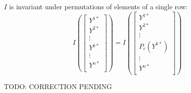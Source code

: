 \begin{appendices}
\begin{lemma}
\label{lemma:single row permutation}
$I$ is invariant under permutations of elements of a single row:
\begin{equation*}
    I \left(
    \begin{bmatrix}
        Y^{1\ast}\\
        Y^{2\ast}\\
        \vdots\\
        Y^{k\ast}\\
        \vdots\\
        Y^{n\ast}\\
    \end{bmatrix}   
    \right)
    =
    I \left(
    \begin{bmatrix}
        Y^{1\ast}\\
        Y^{2\ast}\\
        \vdots\\
        P_c(Y^{k\ast})\\
        \vdots\\
        Y^{n\ast}\\
    \end{bmatrix}   
    \right)
\end{equation*}

\end{lemma}
{\color{red}TODO: CORRECTION PENDING}


\end{appendices}
